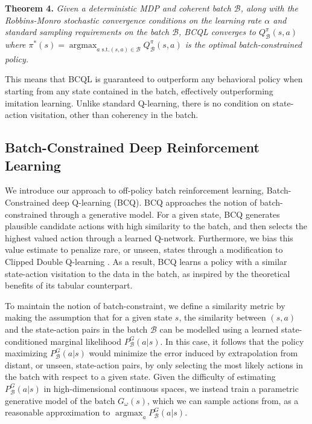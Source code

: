 \documentclass{article}
\newcommand{\al}{\alpha}
\newcommand{\w}{\omega}
\newcommand{\B}{\mathcal{B}}
\DeclareMathOperator*{\argmax}{argmax}
\begin{document}
\textbf{Theorem 4.} \textit{Given a deterministic MDP and coherent batch $\B$, along with the Robbins-Monro stochastic convergence conditions on the learning rate $\al$ and standard sampling requirements on the batch $\B$, BCQL converges to $Q^\pi_\B(s,a)$ where $\pi^*(s) = \argmax_{a \text{ s.t.} (s,a) \in \B} Q^\pi_\B(s,a)$ is the optimal batch-constrained policy.}

This means that BCQL is guaranteed to outperform any behavioral policy when starting from any state contained in the batch, effectively outperforming imitation learning. Unlike standard Q-learning, there is no condition on state-action visitation, other than coherency in the batch. 

\subsection{Batch-Constrained Deep Reinforcement Learning} \label{sec:BCQ}

We introduce our approach to off-policy batch reinforcement learning, Batch-Constrained deep Q-learning (BCQ). BCQ approaches the notion of batch-constrained through a generative model. For a given state, BCQ generates plausible candidate actions with high similarity to the batch, and then selects the highest valued action through a learned Q-network. 
Furthermore, we bias this value estimate to penalize rare, or unseen, states through a modification to Clipped Double Q-learning \cite{fujimoto2018addressing}. As a result, BCQ learns a policy with a similar state-action visitation to the data in the batch, as inspired by the theoretical benefits of its tabular counterpart.

To maintain the notion of batch-constraint, we define a similarity metric by making the assumption that for a given state $s$, the similarity between $(s,a)$ and the state-action pairs in the batch $\B$ can be modelled using a learned state-conditioned marginal likelihood $P_\B^G(a|s)$. In this case, it follows that the policy maximizing $P_\B^G(a|s)$ would minimize the error induced by extrapolation from distant, or unseen, state-action pairs, by only selecting the most likely actions in the batch with respect to a given state. 
Given the difficulty of estimating $P_\B^G(a|s)$ in high-dimensional continuous spaces, 
we instead train a parametric generative model of the batch $G_\w(s)$, which we can sample actions from, as a reasonable approximation to $\argmax_a P_\B^G(a|s)$. 
\end{document}
